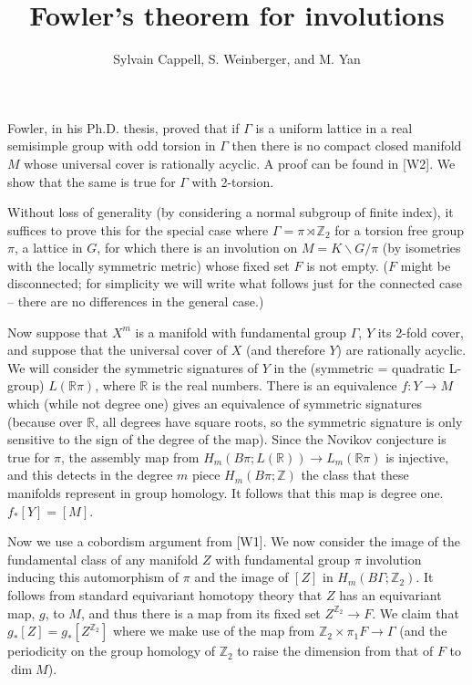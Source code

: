 \documentclass{article}
\title{Fowler's theorem for involutions}
\author{Sylvain Cappell, S. Weinberger, and M. Yan}
\begin{document}
\maketitle

Fowler, in his Ph.D. thesis, proved that if $\Gamma$ is a uniform lattice in a real semisimple group with odd torsion in $\Gamma$ then there is no compact closed manifold $M$ whose universal cover is rationally acyclic. A proof can be found in [W2]. We show that the same is true for $\Gamma$ with 2-torsion.

Without loss of generality (by considering a normal subgroup of finite index), it suffices to prove this for the special case where $\Gamma = \pi \rtimes \mathbb{Z}_{2}$ for a torsion free group $\pi$, a lattice in $G$, for which there is an involution on $M = K\backslash G/\pi$ (by isometries with the locally symmetric metric) whose fixed set $F$ is not empty. ($F$ might be disconnected; for simplicity we will write what follows just for the connected case -- there are no differences in the general case.)

Now suppose that $X^{m}$ is a manifold with fundamental group $\Gamma$, $Y$ its 2-fold cover, and suppose that the universal cover of $X$ (and therefore $Y$) are rationally acyclic. We will consider the symmetric signatures of $Y$ in the (symmetric = quadratic L-group) $L(\mathbb{R}\pi)$, where $\mathbb{R}$ is the real numbers. There is an equivalence $f:Y \to M$ which (while not degree one) gives an equivalence of symmetric signatures (because over $\mathbb{R}$, all degrees have square roots, so the symmetric signature is only sensitive to the sign of the degree of the map). Since the Novikov conjecture is true for $\pi$, the assembly map from $H_{m}(B\pi; L(\mathbb{R})) \to L_{m}(\mathbb{R}\pi)$ is injective, and this detects in the degree $m$ piece $H_{m}(B\pi; \mathbb{Z})$ the class that these manifolds represent in group homology. It follows that this map is degree one. $f_{*}[Y] = [M]$.

Now we use a cobordism argument from [W1]. We now consider the image of the fundamental class of any manifold $Z$ with fundamental group $\pi$ involution inducing this automorphism of $\pi$ and the image of $[Z]$ in $H_{m}(B\Gamma; \mathbb{Z}_{2})$. It follows from standard equivariant homotopy theory that $Z$ has an equivariant map, $g$, to $M$, and thus there is a map from its fixed set $Z^{\mathbb{Z}_2} \to F$. We claim that $g_{*}[Z] = g_{*}[Z^{\mathbb{Z}_2}]$ where we make use of the map from $\mathbb{Z}_{2} \times \pi_{1}F \to \Gamma$ (and the periodicity on the group homology of $\mathbb{Z}_{2}$ to raise the dimension from that of $F$ to $\dim M$).
\end{document}
